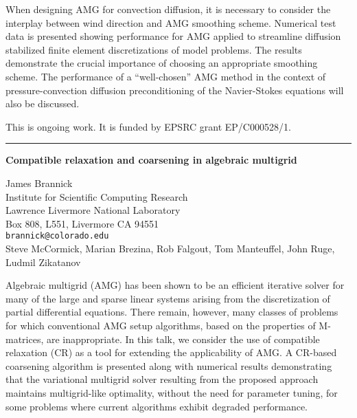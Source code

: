 \documentclass[twosided]{report}
\begin{document}
When designing AMG for
convection diffusion, it is necessary to consider the
interplay between wind direction and AMG smoothing scheme.
Numerical test data is presented showing performance for AMG
applied to streamline diffusion stabilized finite element
discretizations of model problems. The results demonstrate
the crucial importance of choosing an appropriate smoothing
scheme. The performance of a ``well-chosen'' AMG method in the
context of pressure-convection diffusion preconditioning of
the Navier-Stokes equations will also be discussed.

This is ongoing work.
It is funded by EPSRC grant EP/C000528/1.


	\begin{center} \rule{6in}{1pt} \end{center}

\begin{center}
{\large			%
{\bf Compatible relaxation and coarsening in algebraic multigrid}}

	James Brannick \\
	Institute for Scientific Computing Research \\
	Lawrence Livermore National Laboratory \\
	Box 808, L551, Livermore CA 94551 \\
	{\tt brannick@colorado.edu} \\
	Steve McCormick, Marian Brezina,
	Rob Falgout, Tom Manteuffel, John Ruge, Ludmil Zikatanov
\end{center}
Algebraic multigrid (AMG) has been shown to be an efficient
iterative solver for many of the large and sparse linear
systems arising from the discretization of partial
differential equations. There remain, however, many classes
of problems for which conventional AMG setup algorithms,
based on the properties of M-matrices, are inappropriate. In
this talk, we consider the use of compatible relaxation (CR)
as a tool for extending the applicability of AMG. A CR-based
coarsening algorithm is presented along with numerical
results demonstrating that the variational multigrid solver
resulting from the proposed approach maintains
multigrid-like optimality, without the need for parameter
tuning, for some problems where current algorithms exhibit
degraded performance.
\end{document}
